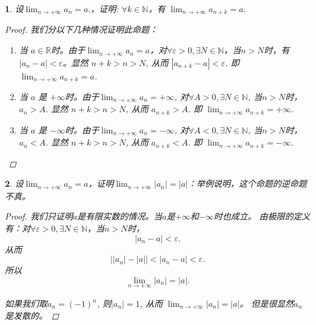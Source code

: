 \documentclass[utf8]{book}
\newtheorem{example}{}[section]             %
\begin{document}
\begin{example}
设$\displaystyle \lim_{n\to +\infty}a_n = a.$，证明: $\forall k \in \mathbb{N}$，有 $\displaystyle \lim_{n\to +\infty}a_{n+k} = a.$
\begin{proof}
我们分以下几种情况证明此命题：
\renewcommand\labelenumi{\normalfont(\theenumi)}
\begin{enumerate}
\item 当 $a\in \mathbb{R}$时。由于$\displaystyle \lim_{n\to +\infty}a_n = a$，对$\forall \varepsilon > 0, \exists N \in \mathbb{N}$，当$n > N$时，有$\left | a_n - a\right | < \varepsilon$。显然 $n+k > n > N$, 从而 $\left | a_{n + k} - a\right | < \varepsilon$. 即 $\displaystyle \lim_{n\to +\infty}a_{n+k} = a$.
\item 当 $a$ 是 $+\infty$时。由于$\displaystyle \lim_{n\to +\infty}a_n = +\infty$, 对$\forall A > 0, \exists N \in \mathbb{N}$, 当$n > N$时， $a_n > A$. 显然 $n+k > n > N$, 从而 $a_{n + k} > A$. 即 $\displaystyle \lim_{n\to +\infty}a_{n+k} = +\infty$.
\item 当 $a$ 是 $-\infty$时。由于$\displaystyle \lim_{n\to +\infty}a_n = -\infty$, 对$\forall A < 0, \exists N \in \mathbb{N}$, 当$n > N$时， $a_n < A$. 显然 $n+k > n > N$, 从而 $a_{n + k} < A$. 即 $\displaystyle \lim_{n\to +\infty}a_{n+k} = -\infty$.
\end{enumerate}
\end{proof}
\end{example}

\begin{example}
设$\displaystyle \lim_{n\to +\infty}a_n = a$，证明$\displaystyle \lim_{n\to +\infty}\left |a_n\right | = \left |a\right |$：举例说明，这个命题的逆命题不真。
\begin{proof}
我们只证明$a$是有限实数的情况。当$a$是$+\infty$和$-\infty$时也成立。
由极限的定义有：对$\forall \varepsilon > 0, \exists N \in \mathbb{N}$，当$n > N$时，$$\left|a_n - a\right| < \varepsilon.$$
从而
$$\left| \left|a_n \right| - \left|a\right| \right | < \left|a_n - a\right| < \varepsilon.$$
所以 $$\lim_{n\to +\infty}\left |a_n\right | = \left |a\right |.$$

如果我们取$a_n = (-1)^n$, 则$\left | a_n\right | = 1$, 从而 $\displaystyle \lim_{n\to +\infty}\left |a_n\right | = \left |a\right |$。 但是很显然$a_n$是发散的。

\end{proof}

\end{example}
\end{document}

